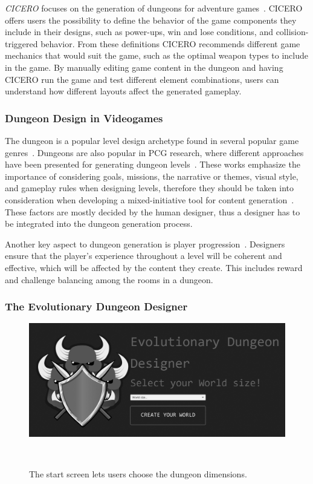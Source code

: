 \emph{CICERO} focuses on the generation of dungeons for adventure games~. CICERO offers users the possibility to define the behavior of the game components they include in their designs, such as power-ups, win and lose conditions, and collision-triggered behavior. From these definitions CICERO recommends different game mechanics that would suit the game, such as the optimal weapon types to include in the game. By manually editing game content in the dungeon and having CICERO run the game and test different element combinations, users can understand how different layouts affect the generated gameplay. 

\subsubsection{Dungeon Design in Videogames}
The dungeon is a popular level design archetype found in several popular game genres~. Dungeons are also popular in PCG research, where different approaches have been presented for generating dungeon levels~. These works emphasize the importance of considering goals, missions, the narrative or themes, visual style, and gameplay rules when designing levels, therefore they should be taken into consideration when developing a mixed-initiative tool for content generation~. These factors are mostly decided by the human designer, thus a designer has to be integrated into the dungeon generation process. 

Another key aspect to dungeon generation is player progression~. Designers ensure that the player’s experience throughout a level will be coherent and effective, which will be affected by the content they create. This includes reward and challenge balancing among the rooms in a dungeon.

\subsubsection{The Evolutionary Dungeon Designer}

\begin{figure}[t]
    \centering
    \includegraphics[width=1\columnwidth]{included-papers-tex/paper-1/figures-extra/start-edited.png}
    \caption{The start screen lets users choose the dungeon dimensions.}~\label{p1fig:launch}
\end{figure}

